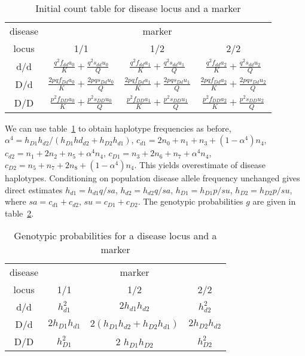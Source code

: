 \begin{table}[h]
\centering
\caption{Initial count table for disease locus and a marker\label{initwotwo}}
\vskip 0.3cm
\begin{tabular}{cccc}
\hline
disease  & \multicolumn{3}{c}{marker}\\ \cline{2-4}
locus&1/1 & 1/2 & 2/2 \\
\hline
d/d  & $\frac{  q^2 f_{dd}a_{0}}{K} +\frac{  q^2 s_{dd}u_{0}}{Q}$&
       $\frac{  q^2 f_{dd}a_{1}}{K} +\frac{  q^2 s_{dd}u_{1}}{Q}$&
       $\frac{  q^2 f_{dd}a_{2}}{K} +\frac{  q^2 s_{dd}u_{2}}{Q}$\\
D/d  & $\frac{2 p q f_{Dd}a_{0}}{K} +\frac{2 p q s_{Dd}u_{0}}{Q}$&
       $\frac{2 p q f_{Dd}a_{1}}{K} +\frac{2 p q s_{Dd}u_{1}}{Q}$&
       $\frac{2 p q f_{Dd}a_{2}}{K} +\frac{2 p q s_{Dd}u_{2}}{Q}$\\
D/D  & $\frac{  p^2 f_{DD}a_{0}}{K} +\frac{  p^2 s_{DD}u_{0}}{Q}$&
       $\frac{  p^2 f_{DD}a_{1}}{K} +\frac{  p^2 s_{DD}u_{1}}{Q}$&
       $\frac{  p^2 f_{DD}a_{2}}{K} +\frac{  p^2 s_{DD}u_{2}}{Q}$\\
\hline
\end{tabular}
\end{table}

We can use table~\ref{initwotwo} to obtain haplotype frequencies as before,
 $\alpha^4=h_{D1} h_{d2}/(h_{D1} hd_{d2}+h_{D2} h_{d1})$, $c_{d1} = 2
n_{0}+n_{1}+n_{3}+(1-\alpha^4) n_{4}$, $c_{d2} = n_{1}+2 n_{2}+n_{5}+\alpha^4
n_{4}$, $c_{D1} = n_{3}+2 n_{6}+n_{7}+\alpha^4 n_{4}$, $c_{D2} = n_{5}+n_{7}+2
n_{8}+(1-\alpha^4) n_{4}$.  This yields overestimate of disease haplotypes.
Conditioning on population disease allele frequency unchanged gives direct
estimates $h_{d1} = h_{d1}q/sa$, $h_{d2} = h_{d2}q/sa$, $h_{D1} = h_{D1}p/su$,
$h_{D2} = h_{D2}p/su$, where $sa=c_{d1}+c_{d2}$, $su=c_{D1}+c_{D2}$.  The
genotypic probabilities $g$ are given in table~\ref{dmg}.

\begin{table}[h]
\centering
\caption{Genotypic probabilities for a disease locus and a marker\label{dmg}}
\vskip 0.3cm
\begin{tabular}{cccc}
\hline
disease  & \multicolumn{3}{c}{marker}\\ \cline{2-4}
locus & 1/1 & 1/2 & 2/2 \\
\hline
d/d & $h_{d1}^2$ & $2 h_{d1} h_{d2}$ & $h_{d2}^2$ \\
D/d & $2 h_{D1} h_{d1}$ & $2 (h_{D1} h_{d2}+h_{D2} h_{d1})$&$2 h_{D2} h_{d2}$\\
D/D & $h_{D1}^2$ & 2 $h_{D1} h_{D2}$ & $h_{D2}^2$ \\
\hline
\end{tabular}
\end{table}


